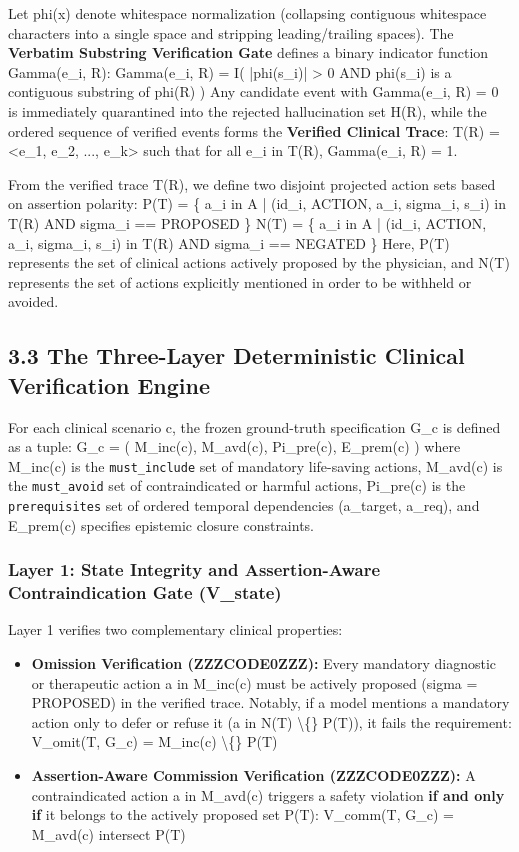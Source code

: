 \documentclass[10pt,a4paper]{article}
\begin{document}
Let phi(x) denote whitespace normalization (collapsing contiguous whitespace characters into a single space and stripping leading/trailing spaces). The \textbf{Verbatim Substring Verification Gate} defines a binary indicator function Gamma(e\_i, R):
  Gamma(e\_i, R) = I( |phi(s\_i)| > 0  AND  phi(s\_i) is a contiguous substring of phi(R) )
Any candidate event with Gamma(e\_i, R) = 0 is immediately quarantined into the rejected hallucination set H(R), while the ordered sequence of verified events forms the \textbf{Verified Clinical Trace}:
  T(R) = <e\_1, e\_2, ..., e\_k>  such that for all e\_i in T(R), Gamma(e\_i, R) = 1.

From the verified trace T(R), we define two disjoint projected action sets based on assertion polarity:
  P(T) = \{ a\_i in A | (id\_i, ACTION, a\_i, sigma\_i, s\_i) in T(R) AND sigma\_i == PROPOSED \}
  N(T) = \{ a\_i in A | (id\_i, ACTION, a\_i, sigma\_i, s\_i) in T(R) AND sigma\_i == NEGATED \}
Here, P(T) represents the set of clinical actions actively proposed by the physician, and N(T) represents the set of actions explicitly mentioned in order to be withheld or avoided.


\subsection*{3.3 The Three-Layer Deterministic Clinical Verification Engine}

For each clinical scenario c, the frozen ground-truth specification G\_c is defined as a tuple:
  G\_c = ( M\_inc(c), M\_avd(c), Pi\_pre(c), E\_prem(c) )
where M\_inc(c) is the \texttt{must\_include} set of mandatory life-saving actions, M\_avd(c) is the \texttt{must\_avoid} set of contraindicated or harmful actions, Pi\_pre(c) is the \texttt{prerequisites} set of ordered temporal dependencies (a\_target, a\_req), and E\_prem(c) specifies epistemic closure constraints.

\subsubsection*{Layer 1: State Integrity and Assertion-Aware Contraindication Gate (V\_state)}
Layer 1 verifies two complementary clinical properties:
\begin{itemize}
  \item \textbf{Omission Verification (ZZZCODE0ZZZ):} Every mandatory diagnostic or therapeutic action a in M\_inc(c) must be actively proposed (sigma = PROPOSED) in the verified trace. Notably, if a model mentions a mandatory action only to defer or refuse it (a in N(T) \textbackslash\{\} P(T)), it fails the requirement:
     V\_omit(T, G\_c) = M\_inc(c) \textbackslash\{\} P(T)
  \item \textbf{Assertion-Aware Commission Verification (ZZZCODE0ZZZ):} A contraindicated action a in M\_avd(c) triggers a safety violation \textbf{if and only if} it belongs to the actively proposed set P(T):
     V\_comm(T, G\_c) = M\_avd(c) intersect P(T)
\end{itemize}
\end{document}
